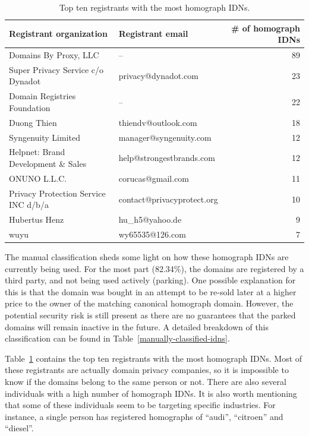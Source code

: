 \documentclass[letterpaper,twocolumn,10pt]{article}
\begin{document}
\begin{table}[]
\centering
\begin{tabular}{llr}
\hline
Registrant organization              & Registrant email           & \# of homograph IDNs \\ \hline
Domains By Proxy, LLC                & --                         & 89                   \\
Super Privacy Service c/o Dynadot    & privacy@dynadot.com        & 23                   \\
Domain Registries Foundation         & --                         & 22                   \\
Duong Thien                          & thiendv@outlook.com        & 18                   \\
Syngenuity Limited                   & manager@syngenuity.com     & 12                   \\
Helpnet: Brand Development \& Sales  & help@strongestbrands.com   & 12                   \\
ONUNO L.L.C.                         & corucas@gmail.com          & 11                   \\
Privacy Protection Service INC d/b/a & contact@privacyprotect.org & 10                   \\
Hubertus Henz                        & hu\_h5@yahoo.de            & 9                    \\
wuyu                                 & wy65535@126.com            & 7                    \\ \hline
\end{tabular}
\caption{Top ten registrants with the most homograph IDNs.}
\label{top-registrants-homograph-idns}
\end{table}

The manual classification sheds some light on how these homograph IDNs are currently being used.
For the most part (82.34\%), the domains are registered by a third party, and not being used actively (parking).
One possible explanation for this is that the domain was bought in an attempt to be re-sold later at a higher price to the owner of the matching canonical homograph domain.
However, the potential security risk is still present as there are no guarantees that the parked domains will remain inactive in the future.
A detailed breakdown of this classification can be found in Table~\ref{manually-classified-idns}.

Table~\ref{top-registrants-homograph-idns} contains the top ten registrants with the most homograph IDNs.
Most of these registrants are actually domain privacy companies, so it is impossible to know if the domains belong to the same person or not.
There are also several individuals with a high number of homograph IDNs.
It is also worth mentioning that some of these individuals seem to be targeting specific industries.
For instance, a single person has registered homographs of ``audi'', ``citroen'' and ``diesel''.
\end{document}
